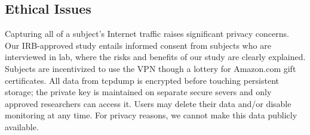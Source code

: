 


\subsection{Ethical Issues}
Capturing all of a subject's Internet traffic raises significant
privacy concerns. Our IRB-approved study entails informed consent from
subjects who are interviewed in lab, where the risks and benefits of
our study are clearly explained. Subjects are incentivized to use the
VPN though a lottery for Amazon.com gift certificates. All data from
tcpdump is encrypted before touching persistent storage; the private
key is maintained on separate secure severs and only approved
researchers can access it. Users may delete their data and/or disable
monitoring at any time. For privacy reasons, we cannot make this data
publicly available.

